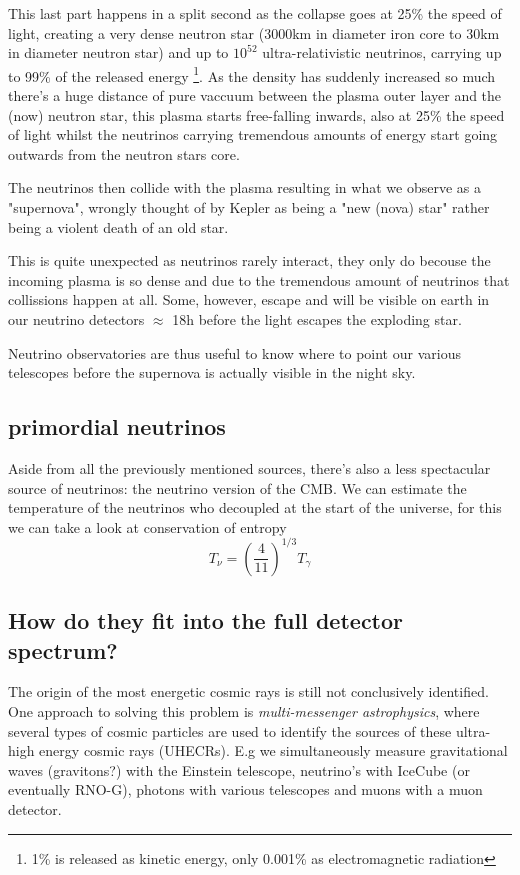\documentclass[11pt,a4paper,faculty=we,language=en,doctype=report]{cls/ugent-doc}
\begin{document}
This last part happens in a split second as the collapse goes at 25\% the speed of light, 
creating a very dense neutron star (3000km in diameter iron core to 30km in diameter neutron star) 
and up to $10^{52}$ ultra-relativistic neutrinos, carrying up to 99\% of the
released energy \cite{Melson_2015}\footnote{1\% is released as kinetic energy, only 0.001\% as electromagnetic radiation}.
As the density has suddenly
increased so much there's a huge distance of pure vaccuum between the plasma
outer layer and the (now) neutron star, this plasma starts free-falling inwards, 
also at 25\% the speed of light whilst the neutrinos carrying tremendous amounts 
of energy start going outwards from the neutron stars core.

The neutrinos then collide with the plasma resulting in what we observe as a "supernova", wrongly
thought of by Kepler as being a "new (nova) star" rather being a violent death
of an old star.

This is quite unexpected as neutrinos rarely interact, they only do becouse the
incoming plasma is so dense and due to the tremendous amount of neutrinos that 
collissions happen at all. Some, however, escape and will be visible on earth in 
our neutrino detectors $\approx$ 18h before the light escapes the exploding star.

Neutrino observatories are thus useful to know where to point our various
telescopes before the supernova is actually visible in the night sky.
\subsection{primordial neutrinos}
Aside from all the previously mentioned sources, there's also a less spectacular source of 
neutrinos: the neutrino version of the CMB.
We can estimate the temperature of the neutrinos who decoupled at the start of the universe, 
for this we can take a look at conservation of entropy \cite{Dodelson}
\begin{equation}
	T_\nu = \left(\frac{4}{11}\right)^{1/3}T_\gamma
\end{equation}
\subsection{How do they fit into the full detector spectrum?}
The origin of the most energetic cosmic rays is still not conclusively
identified. One approach to solving this problem is \textit{multi-messenger
astrophysics}, where several types of cosmic particles are used to identify the
sources of these ultra-high energy cosmic rays (UHECRs). E.g we simultaneously
measure gravitational waves (gravitons?) with the Einstein telescope,
neutrino's with IceCube (or eventually RNO-G), photons with various telescopes
and muons with a muon detector.
\newpage
\end{document}
